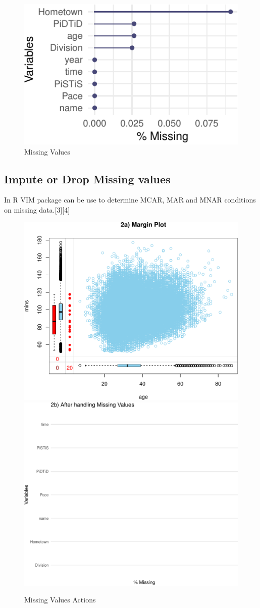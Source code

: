 \documentclass[
]{article}
\begin{document}
\begin{figure}[H]

{\centering \includegraphics{case_study02_SO02_files/figure-latex/unnamed-chunk-6-1} 

}

\caption{Missing Values}\label{fig:unnamed-chunk-6}
\end{figure}

\hypertarget{impute-or-drop-missing-values}{%
\subsection{Impute or Drop Missing
values}\label{impute-or-drop-missing-values}}

In R VIM package can be use to determine MCAR, MAR and MNAR conditions
on missing data.{[}3{]}{[}4{]}

\begin{figure}[H]

\includegraphics[width=.49\linewidth,]{case_study02_SO02_files/figure-latex/unnamed-chunk-7-1} \includegraphics[width=.49\linewidth,]{case_study02_SO02_files/figure-latex/unnamed-chunk-7-2} \hfill{}

\caption{Missing Values Actions}\label{fig:unnamed-chunk-7}
\end{figure}
\end{document}
